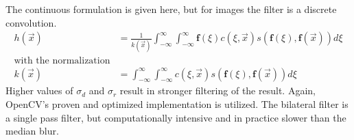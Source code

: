 The continuous formulation is given here, but for images the filter is a discrete convolution.
\begin{equation}
\begin{aligned}
    h(\vec{x}) &= \frac{1}{k(\vec{x})} \int_{-\infty}^{\infty} \int_{-\infty}^{\infty} \mathbf{f}(\xi) c(\xi, \vec{x}) s(\mathbf{f}(\xi), \mathbf{f}(\vec{x})) d\xi \\
    \text{with the normalization} \\
    k(\vec{x}) &= \int_{-\infty}^{\infty} \int_{-\infty}^{\infty} c(\xi, \vec{x}) s(\mathbf{f}(\xi), \mathbf{f}(\vec{x})) d\xi
\end{aligned}
\end{equation}
Higher values of $\sigma_d$ and $\sigma_r$ result in stronger filtering of the result.
Again, OpenCV's\cite{opencv_library} proven and optimized implementation is utilized.
The bilateral filter is a single pass filter, but computationally intensive and in practice slower than the median blur.
